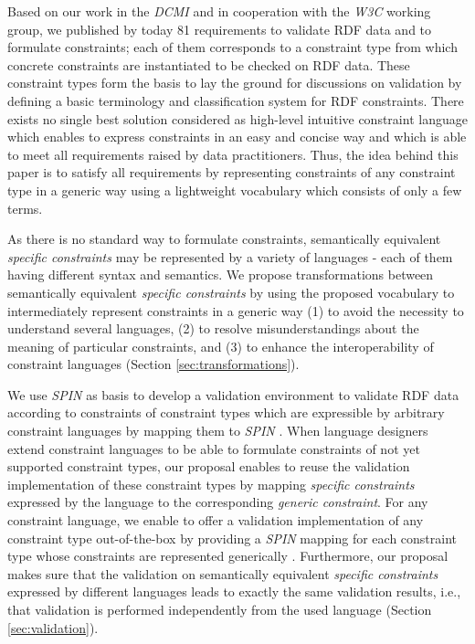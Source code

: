 \documentclass[a4paper,fontsize=11pt]{scrartcl}
\begin{document}
Based on our work in the \emph{DCMI} and in cooperation with the \emph{W3C} working group,
we published by today 81 requirements to validate RDF data and to formulate constraints; 
each of them corresponds to a constraint type from which concrete constraints are instantiated to be checked on RDF data.
These constraint types form the basis to
lay the ground for discussions on validation
by defining a basic terminology and classification system for RDF constraints.
%
There exists no single best solution considered as high-level intuitive constraint language which enables to express constraints in an easy and concise way and which is able to meet all requirements raised by data practitioners.
Thus, the idea behind this paper is to satisfy all requirements
by representing constraints of any constraint type in a generic way using a lightweight vocabulary which consists of only a few terms.

As there is no standard way to formulate constraints, 
semantically equivalent \emph{specific constraints} may be represented by a variety of languages - each of them having different syntax and semantics.
We propose transformations between semantically equivalent \emph{specific constraints}
by using the proposed vocabulary to intermediately represent constraints in a generic way
(1) to avoid the necessity to understand several languages,
(2) to resolve misunderstandings about the meaning of particular constraints, and
(3) to enhance the interoperability of constraint languages (Section \ref{sec:transformations}).

We use \emph{SPIN} as basis to develop a validation environment to validate RDF data according to constraints of constraint types which are expressible by arbitrary constraint languages by mapping them to \emph{SPIN} \cite{BoschEckert2014-2}.
When language designers extend constraint languages 
to be able to formulate constraints of not yet supported constraint types,
our proposal enables to reuse the validation implementation of these constraint types 
by mapping \emph{specific constraints} expressed by the language to the corresponding \emph{generic constraint}.
For any constraint language, we enable to offer a validation implementation of any constraint type out-of-the-box
by providing a \emph{SPIN} mapping
for each constraint type  
whose constraints are represented generically \cite{BoschEckert2015-2}. 
Furthermore, our proposal makes sure that the validation on semantically equivalent \emph{specific constraints} expressed by different languages
leads to exactly the same validation results, 
i.e., that validation is performed independently from the used language (Section \ref{sec:validation}).
\end{document}
